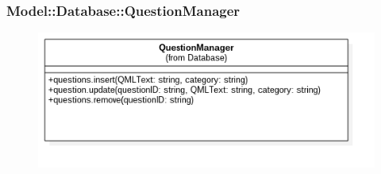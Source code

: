 \subsubsection{Model::Database::QuestionManager}
\begin{figure}[h!]
\begin{center}
	\includegraphics[scale=0.4]{../images/Model/Database/QuestionManager.png}
\end{center}
\end{figure}
